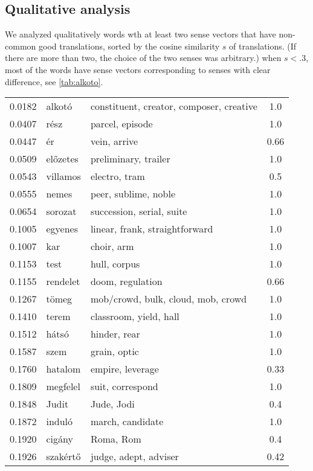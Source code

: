 \documentclass[11pt]{article}
\begin{document}
\subsection{Qualitative analysis}

We analyzed qualitatively words wth at least two sense vectors that have
non-common good translations, sorted by the cosine similarity $s$ of translations.
(If there are more than two, the choice of the two senses was arbitrary.)
when $s<.3$, most of the words have sense vectors corresponding to senses with
clear difference, see \cref{tab:alkoto}.

\begin{table*}
  \begin{tabular}{cllc}
  0.0182 & alkotó 	& constituent, creator, composer, creative	&  1.0 \\
  0.0407 & rész 	& parcel, episode	&  1.0 \\
  0.0447 & ér 	& vein, arrive	&  0.66 \\
  0.0509 & előzetes 	& preliminary, trailer	&  1.0 \\
  0.0543 & villamos 	& electro, tram	&  0.5 \\
  0.0555 & nemes 	& peer, sublime, noble	&  1.0 \\
  0.0654 & sorozat 	& succession, serial, suite	&  1.0 \\
  0.1005 & egyenes 	& linear, frank, straightforward	&  1.0 \\
  0.1007 & kar 	& choir, arm	&  1.0 \\
  0.1153 & test 	& hull, corpus	&  1.0 \\
  0.1155 & rendelet 	& doom, regulation	&  0.66 \\
  0.1267 & tömeg 	& mob/crowd, bulk, cloud, mob, crowd	&  1.0 \\
  0.1410 & terem 	& classroom, yield, hall	&  1.0 \\
  0.1512 & hátsó 	& hinder, rear	&  1.0 \\
  0.1587 & szem 	& grain, optic	&  1.0 \\
  0.1760 & hatalom 	& empire, leverage	&  0.33 \\
  0.1809 & megfelel 	& suit, correspond	&  1.0 \\
  0.1848 & Judit 	& Jude, Jodi	&  0.4 \\
  0.1872 & induló 	& march, candidate	&  1.0 \\
  0.1920 & cigány 	& Roma, Rom	&  0.4 \\
  0.1926 & szakértő 	& judge, adept, adviser	& 0.42 \\

\end{tabular}
\end{table*}
\end{document}
